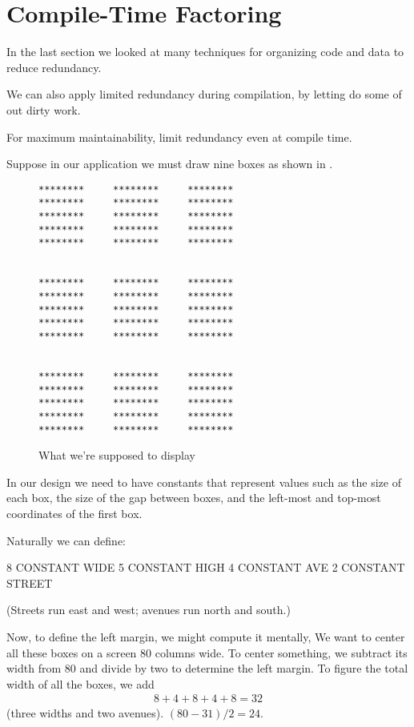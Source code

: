 \section{Compile-Time Factoring}

\noindent
In the last section we looked at many techniques for organizing code
and data to reduce redundancy.

We can also apply limited redundancy during compilation, by letting
\Forth{} do some of out dirty work.

\begin{tip}
For maximum maintainability, limit redundancy even at compile time.
\end{tip}
Suppose in our application we must draw nine boxes as shown in
.

\begin{figure*}[hhhh]
\caption{What we're supposed to display}
\begin{center}
\begin{BVerbatim}[baselinestretch=0.7]
********     ********     ********
********     ********     ********
********     ********     ********
********     ********     ********
********     ********     ********


********     ********     ********
********     ********     ********
********     ********     ********
********     ********     ********
********     ********     ********


********     ********     ********
********     ********     ********
********     ********     ********
********     ********     ********
********     ********     ********
\end{BVerbatim}
\end{center}
\end{figure*}

In our design we need to have constants that represent values such as
the size of each box, the size of the gap between boxes, and the
left-most and top-most coordinates of the first box.

Naturally we can define:

\begin{Code}
8 CONSTANT WIDE
5 CONSTANT HIGH
4 CONSTANT AVE
2 CONSTANT STREET
\end{Code}
(Streets run east and west; avenues run north and south.)

Now, to define the left margin, we might compute it mentally, We want
to center all these boxes on a screen 80 columns wide. To center
something, we subtract its width from 80 and divide by two to
determine the left margin. To figure the total width of all the boxes,
we add
\begin{eqnarray}
8 + 4 + 8 + 4 + 8 = 32\nonumber
\end{eqnarray}
(three widths and two avenues). $(80-31) / 2 = 24$.

